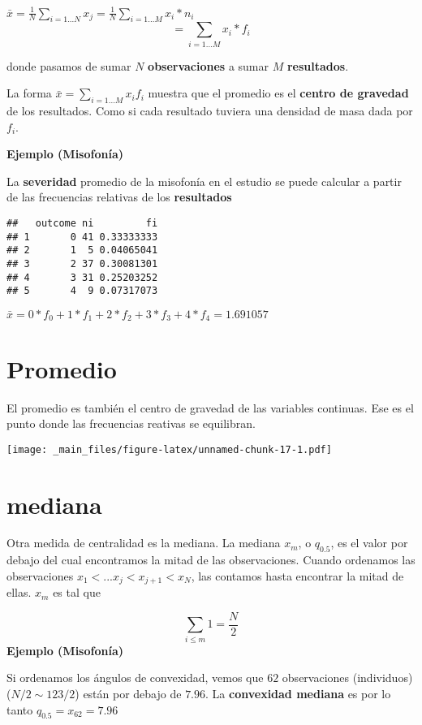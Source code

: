 \documentclass[
]{book}
\begin{document}
\(\bar{x}=\frac{1}{N}\sum_{i=1...N} x_j=\frac{1}{N}\sum_{i=1...M} x_i*n_ {i}\)
\[=\sum_{i=1...M} x_i*f_{i}\]

donde pasamos de sumar \(N\) \textbf{observaciones} a sumar \(M\) \textbf{resultados}.

La forma \(\bar{x}= \sum_{i = 1...M} x_i f_i\) muestra que el promedio es el \textbf{centro de gravedad} de los resultados. Como si cada resultado tuviera una densidad de masa dada por \(f_i\).

\textbf{Ejemplo (Misofonía)}

La \textbf{severidad} promedio de la misofonía en el estudio se puede calcular a partir de las frecuencias relativas de los \textbf{resultados}

\begin{verbatim}
##   outcome ni         fi
## 1       0 41 0.33333333
## 2       1  5 0.04065041
## 3       2 37 0.30081301
## 4       3 31 0.25203252
## 5       4  9 0.07317073
\end{verbatim}

\(\bar{x}=0*f_{0}+1*f_{1}+2*f_{2}+3*f_{3}+4*f_{4}=1.691057\)

\hypertarget{promedio}{%
\section{Promedio}\label{promedio}}

El promedio es también el centro de gravedad de las variables continuas. Ese es el punto donde las frecuencias reativas se equilibran.

\texttt{[image: \_main\_files/figure-latex/unnamed-chunk-17-1.pdf]}

\hypertarget{mediana}{%
\section{mediana}\label{mediana}}

Otra medida de centralidad es la mediana. La mediana \(x_m\), o \(q_{0.5}\), es el valor por debajo del cual encontramos la mitad de las observaciones. Cuando ordenamos las observaciones \(x_1 <... x_j < x_{j+1} < x_N\), las contamos hasta encontrar la mitad de ellas. \(x_m\) es tal que

\[\sum_{i\leq m} 1 = \frac{N}{2}\]
\textbf{Ejemplo (Misofonía)}

Si ordenamos los ángulos de convexidad, vemos que \(62\) observaciones (individuos) (\(N/2 \sim 123/2\)) están por debajo de \(7.96\). La \textbf{convexidad mediana} es por lo tanto \(q_{0.5}=x_{62}=7.96\)
\end{document}
